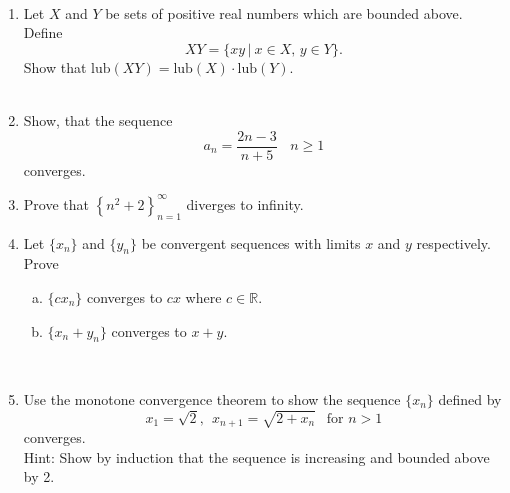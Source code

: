 \documentclass[12pt,letterpaper]{article}
\newcommand{\lub}{\text{lub}}
\theoremstyle{plain}
\theoremstyle{definition}
\begin{document}
\ \\
\begin{enumerate}[1.]
\item Let $X$ and $Y$ be sets of positive real numbers which are bounded above. Define \[XY=\{xy\, |\ x\in X,\, y\in Y\}.\] Show that $\lub(XY)=\lub(X)\cdot \lub(Y)$.  \\
\ \\

\item Show, that the sequence 
\[a_n=\frac{2n-3}{n+5}\ \ \ \ n\geq 1\] 
converges.
\ \\
\item Prove that $\left \{n^2+2\right \}_{n=1}^\infty$ diverges to infinity.       
\ \\
\item Let $\{x_n\}$ and $\{y_n\}$ be convergent sequences with limits $x$ and $y$ respectively. Prove
\begin{enumerate}[(a)]
\item $\{cx_n\}$ converges to $cx$ where $c\in \mathbb{R}$.
\item $\{x_n+y_n\}$ converges to $x+y$. 
\end{enumerate}
\ \\
\item Use the monotone convergence theorem to show the sequence $\{x_n\}$ defined by
\[x_1=\sqrt{2},\ \ x_{n+1}=\sqrt{2+x_{n}}\ \ \text{ for }n>1\]
converges.
\vspace{.15in}\\
Hint: Show by induction that the sequence is increasing and bounded above by 2.

\end{enumerate}
\end{document}
